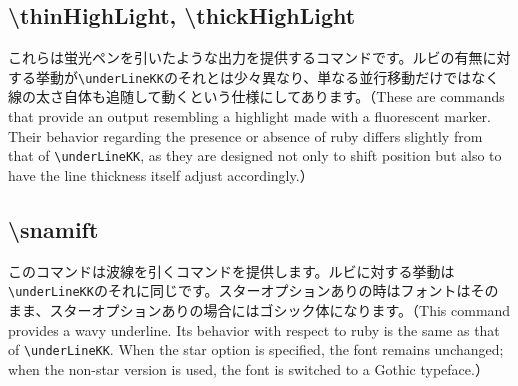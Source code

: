 \documentclass[luatex,fontsize=8pt,paper=b5,twoside]{jlreq}%
\begin{document}
\subsection{\textbackslash thinHighLight, \textbackslash thickHighLight}
これらは蛍光ペンを引いたような出力を提供するコマンドです。ルビの有無に対する挙動が\verb|\underLineKK|のそれとは少々異なり、単なる並行移動だけではなく線の太さ自体も追随して動くという仕様にしてあります。（These are commands that provide an output resembling a highlight made with a fluorescent marker. Their behavior regarding the presence or absence of ruby differs slightly from that of \verb|\underLineKK|, as they are designed not only to shift position but also to have the line thickness itself adjust accordingly.）



\subsection{\textbackslash snamift}
このコマンドは波線を引くコマンドを提供します。ルビに対する挙動は\verb|\underLineKK|のそれに同じです。スターオプションありの時はフォントはそのまま、スターオプションありの場合にはゴシック体になります。（This command provides a wavy underline. Its behavior with respect to ruby is the same as that of \verb|\underLineKK|. When the star option is specified, the font remains unchanged; when the non-star version is used, the font is switched to a Gothic typeface.）
\end{document}
